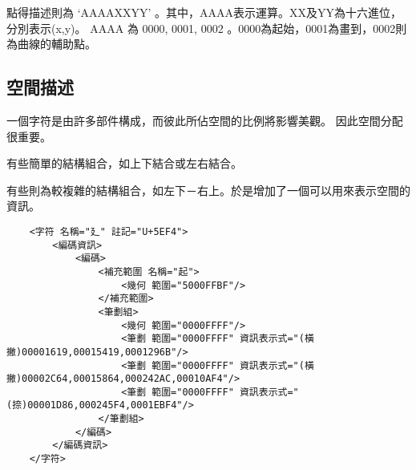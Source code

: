 點得描述則為 `AAAAXXYY' 。其中，AAAA表示運算。XX及YY為十六進位，分別表示(x,y)。
AAAA 為 0000, 0001, 0002 。0000為起始，0001為畫到，0002則為曲線的輔助點。


\subsection{空間描述}
一個字符是由許多部件構成，而彼此所佔空間的比例將影響美觀。
因此空間分配很重要。

有些簡單的結構組合，如上下結合或左右結合。

有些則為較複雜的結構組合，如左下－右上。於是增加了一個可以用來表示空間的資訊。
\listXML\begin{lstlisting}
	<字符 名稱="廴" 註記="U+5EF4">
		<編碼資訊>
			<編碼>
				<補充範圍 名稱="起">
					<幾何 範圍="5000FFBF"/>
				</補充範圍>
				<筆劃組>
					<幾何 範圍="0000FFFF"/>
					<筆劃 範圍="0000FFFF" 資訊表示式="(橫撇)00001619,00015419,0001296B"/>
					<筆劃 範圍="0000FFFF" 資訊表示式="(橫撇)00002C64,00015864,000242AC,00010AF4"/>
					<筆劃 範圍="0000FFFF" 資訊表示式="(捺)00001D86,000245F4,0001EBF4"/>
				</筆劃組>
			</編碼>
		</編碼資訊>
	</字符>
\end{lstlisting}


